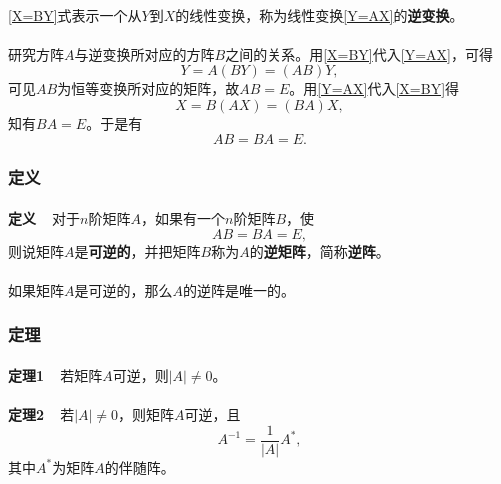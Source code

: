 \paragraph{}
\eqref{X=BY}式表示一个从$Y$到$X$的线性变换，称为线性变换\eqref{Y=AX}的\textbf{逆变换}。

\paragraph{}
研究方阵$A$与逆变换所对应的方阵$B$之间的关系。用\eqref{X=BY}代入\eqref{Y=AX}，可得
\begin{equation*}
  Y = A(BY) = (AB)Y,
\end{equation*}
可见$AB$为恒等变换所对应的矩阵，故$AB=E$。用\eqref{Y=AX}代入\eqref{X=BY}得
\begin{equation*}
  X=B(AX)=(BA)X,
\end{equation*}
知有$BA=E$。于是有
\begin{equation*}
  AB=BA=E.
\end{equation*}

\subsubsection{定义}
\paragraph{}
\textbf{定义~~}对于$n$阶矩阵$A$，如果有一个$n$阶矩阵$B$，使
\begin{equation*}
  AB=BA=E,
\end{equation*}
则说矩阵$A$是\textbf{可逆的}，并把矩阵$B$称为$A$的\textbf{逆矩阵}，简称\textbf{逆阵}。

\paragraph{}
如果矩阵$A$是可逆的，那么$A$的逆阵是唯一的。

\subsubsection{定理}
\paragraph{}
\textbf{定理1~~}若矩阵$A$可逆，则$|A|\neq 0$。

\paragraph{}
\textbf{定理2~~}若$|A|\neq 0$，则矩阵$A$可逆，且
\begin{equation}
  A^{-1} = \frac{1}{|A|}A^*,
\end{equation}
其中$A^*$为矩阵$A$的伴随阵。

